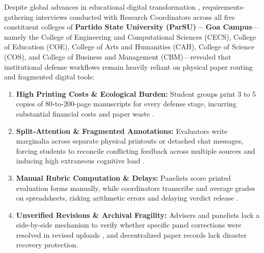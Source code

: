 \documentclass[sigplan,screen,nonacm]{acmart}
\begin{document}
Despite global advances in educational digital transformation \cite{benavides2020digital}, requirements-gathering interviews conducted with Research Coordinators across all five constituent colleges of \textbf{Partido State University (ParSU) -- Goa Campus}---namely the College of Engineering and Computational Sciences (CECS), College of Education (COE), College of Arts and Humanities (CAH), College of Science (COS), and College of Business and Management (CBM)---revealed that institutional defense workflows remain heavily reliant on physical paper routing and fragmented digital tools:
\begin{enumerate}
  \item \textbf{High Printing Costs \& Ecological Burden:} Student groups print 3 to 5 copies of 80-to-200-page manuscripts for every defense stage, incurring substantial financial costs and paper waste \cite{isaeva2016paperless, tatli2024sustainable}.
  \item \textbf{Split-Attention \& Fragmented Annotations:} Evaluators write marginalia across separate physical printouts or detached chat messages, forcing students to reconcile conflicting feedback across multiple sources and inducing high extraneous cognitive load \cite{sweller1988cognitive}.
  \item \textbf{Manual Rubric Computation \& Delays:} Panelists score printed evaluation forms manually, while coordinators transcribe and average grades on spreadsheets, risking arithmetic errors and delaying verdict release \cite{erradi2012automated, chio2022thesist}.
  \item \textbf{Unverified Revisions \& Archival Fragility:} Advisers and panelists lack a side-by-side mechanism to verify whether specific panel corrections were resolved in revised uploads \cite{babatunde2025digital}, and decentralized paper records lack disaster recovery protection.
\end{enumerate}
\end{document}
